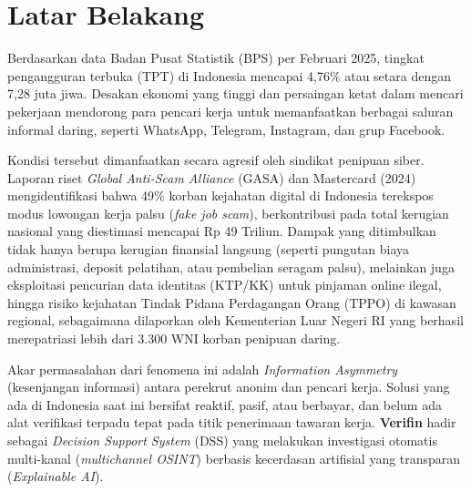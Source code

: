 \documentclass[12pt,a4paper]{article}
\begin{document}
\tableofcontents
\newpage

\section{Latar Belakang}
Berdasarkan data Badan Pusat Statistik (BPS) per Februari 2025, tingkat pengangguran terbuka (TPT) di Indonesia mencapai 4,76\% atau setara dengan 7,28 juta jiwa. Desakan ekonomi yang tinggi dan persaingan ketat dalam mencari pekerjaan mendorong para pencari kerja untuk memanfaatkan berbagai saluran informal daring, seperti WhatsApp, Telegram, Instagram, dan grup Facebook. 

Kondisi tersebut dimanfaatkan secara agresif oleh sindikat penipuan siber. Laporan riset \textit{Global Anti-Scam Alliance} (GASA) dan Mastercard (2024) mengidentifikasi bahwa 49\% korban kejahatan digital di Indonesia terekspos modus lowongan kerja palsu (\textit{fake job scam}), berkontribusi pada total kerugian nasional yang diestimasi mencapai Rp 49 Triliun. Dampak yang ditimbulkan tidak hanya berupa kerugian finansial langsung (seperti pungutan biaya administrasi, deposit pelatihan, atau pembelian seragam palsu), melainkan juga eksploitasi pencurian data identitas (KTP/KK) untuk pinjaman online ilegal, hingga risiko kejahatan Tindak Pidana Perdagangan Orang (TPPO) di kawasan regional, sebagaimana dilaporkan oleh Kementerian Luar Negeri RI yang berhasil merepatriasi lebih dari 3.300 WNI korban penipuan daring.

Akar permasalahan dari fenomena ini adalah \textit{Information Asymmetry} (kesenjangan informasi) antara perekrut anonim dan pencari kerja. Solusi yang ada di Indonesia saat ini bersifat reaktif, pasif, atau berbayar, dan belum ada alat verifikasi terpadu tepat pada titik penerimaan tawaran kerja. \textbf{Verifin} hadir sebagai \textit{Decision Support System} (DSS) yang melakukan investigasi otomatis multi-kanal (\textit{multichannel OSINT}) berbasis kecerdasan artifisial yang transparan (\textit{Explainable AI}).

\end{document}
